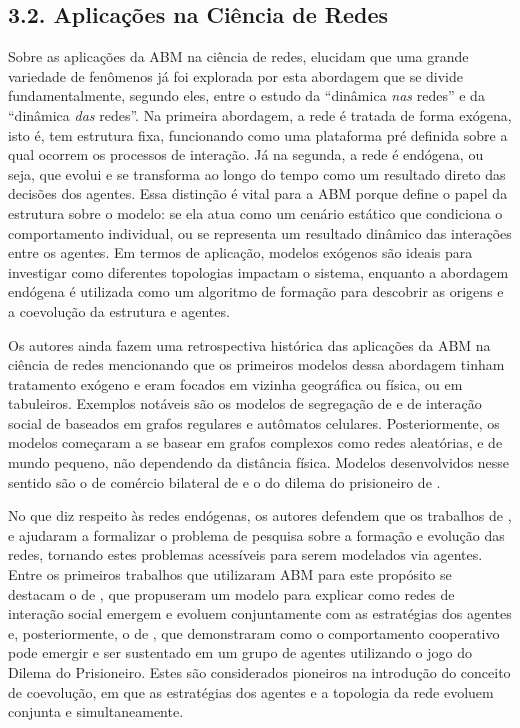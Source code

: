 \documentclass[12pt,oneside,a4paper,brazil,sumario=tradicional]{abntex2}
\begin{document}
\subsection*{3.2. Aplicações na Ciência de Redes}
Sobre as aplicações da ABM na ciência de redes,  elucidam que uma grande variedade de fenômenos já foi explorada por esta abordagem que se divide fundamentalmente, segundo eles, entre o estudo da “dinâmica \textit{nas }redes” e da “dinâmica \textit{das} redes”. Na primeira abordagem, a rede é tratada de forma exógena, isto é, tem estrutura fixa, funcionando como uma plataforma pré definida sobre a qual ocorrem os processos de interação. Já na segunda, a rede é endógena, ou seja, que evolui e se transforma ao longo do tempo como um resultado direto das decisões dos agentes. Essa distinção é vital para a ABM porque define o papel da estrutura sobre o modelo: se ela atua como um cenário estático que condiciona o comportamento individual, ou se representa um resultado dinâmico das interações entre os agentes. Em termos de aplicação, modelos exógenos são ideais para investigar como diferentes topologias impactam o sistema, enquanto a abordagem endógena é utilizada como um algoritmo de formação para descobrir as origens e a coevolução da estrutura e agentes.

Os autores ainda fazem uma retrospectiva histórica das aplicações da ABM na ciência de redes mencionando que os primeiros modelos dessa abordagem tinham tratamento exógeno e eram focados em vizinha geográfica ou física, ou em tabuleiros. Exemplos notáveis são os modelos de segregação de  e de interação social de  baseados em grafos regulares e autômatos celulares. Posteriormente, os modelos começaram a se basear em grafos complexos como redes aleatórias, e de mundo pequeno, não dependendo da distância física. Modelos desenvolvidos nesse sentido são o de comércio bilateral de  e o do dilema do prisioneiro de .

No que diz respeito às redes endógenas, os autores defendem que os trabalhos de , e  ajudaram a formalizar o problema de pesquisa sobre a formação e evolução das redes, tornando estes problemas acessíveis para serem modelados via agentes. Entre os primeiros trabalhos que utilizaram ABM para este propósito se destacam o de , que propuseram um modelo para explicar como redes de interação social emergem e evoluem conjuntamente com as estratégias dos agentes e, posteriormente, o de , que demonstraram como o comportamento cooperativo pode emergir e ser sustentado em um grupo de agentes utilizando o jogo do Dilema do Prisioneiro. Estes são considerados pioneiros na introdução do conceito de coevolução, em que as estratégias dos agentes e a topologia da rede evoluem conjunta e simultaneamente.
\end{document}
